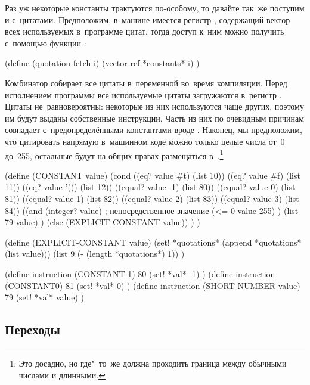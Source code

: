 Раз уж некоторые константы трактуются по-особому, то давайте так~же поступим и
с~цитатами. Предположим, в~машине имеется регистр , содержащий
вектор всех используемых в~программе цитат, тогда доступ к~ним можно получить
с~помощью функции :

\begin{code:lisp}
(define (quotation-fetch i)
  (vector-ref *constants* i) )
\end{code:lisp}

Комбинатор  собирает все цитаты в~переменной 
во~время компиляции. Перед исполнением программы все используемые цитаты
загружаются в~регистр . Цитаты не~равновероятны: некоторые из
них используются чаще других, поэтому им будут выданы собственные инструкции.
Часть из них по очевидным причинам совпадает с~предопределёнными константами
вроде . Наконец, мы предположим, что цитировать напрямую
в~машинном коде можно только целые числа от~0 до~255, остальные будут на общих
правах размещаться в~.\footnote*{Это досадно, но где"~то~же
должна проходить граница между обычными числами и длинными.}

\begin{code:lisp}
(define (CONSTANT value)
  (cond ((eq? value #t)    (list 10))
        ((eq? value #f)    (list 11))
        ((eq? value '())   (list 12))
        ((equal? value -1) (list 80))
        ((equal? value 0)  (list 81))
        ((equal? value 1)  (list 82))
        ((equal? value 2)  (list 83))
        ((equal? value 3)  (list 84))
        ((and (integer? value)   ; непосредственное значение
              (<= 0 value 255) )
         (list 79 value) )
        (else (EXPLICIT-CONSTANT value)) ) )

(define (EXPLICIT-CONSTANT value)
  (set! *quotations* (append *quotations* (list value)))
  (list 9 (- (length *quotations*) 1)) )

(define-instruction (CONSTANT-1) 80
  (set! *val* -1) )
(define-instruction (CONSTANT0) 81
  (set! *val* 0) )
(define-instruction (SHORT-NUMBER value) 79
  (set! *val* value) )
\end{code:lisp}


\subsection{Переходы}\label{compilation/instruction/ssect:jumps}

